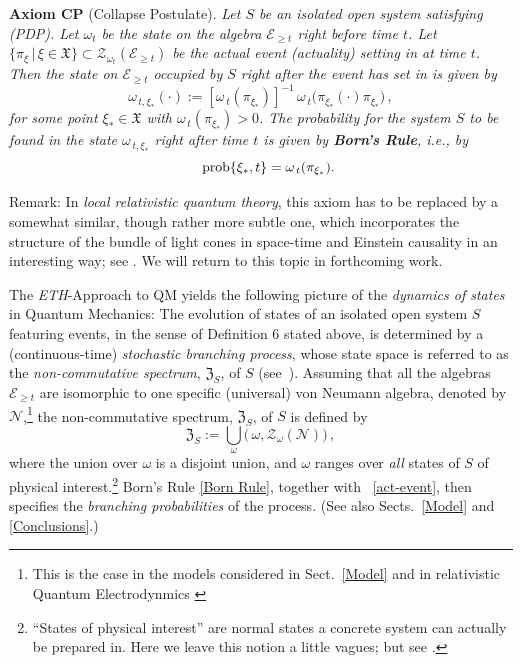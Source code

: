 \documentclass[12pt]{article}
\begin{document}
{\bf{Axiom CP}} (Collapse Postulate).\label{collapseaxiom} \textit{Let $S$ be an isolated open system satisfying (\textit{PDP}). Let
$\omega_t$ be the state on the algebra $\mathcal{E}_{\geq t}$ right \textit{before} time $t$. Let
$\big\{ \pi_{\xi} \,|\, \xi \in \mathfrak{X} \big\} \subset \mathcal{Z}_{\omega_t}(\mathcal{E}_{\geq t})$ be the actual event (actuality) setting in at time $t$. Then the state on $\mathcal{E}_{\geq t}$ occupied by $S$ right \textit{after} the event has set in is given by
$$
\omega_{\,t, \xi_{*}}(\cdot):=[\omega_{\,t}(\pi_{\xi_{*}})]^{-1}\,\omega_{\,t}\big(\pi_{\xi_{*}} (\cdot) \pi_{\xi_{*}}\big) \,,
$$
for some point $\xi_{*} \in \mathfrak{X}$ with $\omega_{\,t}(\pi_{\xi_{*}})>0$. The probability for the system $S$ to be found in the state $\omega_{\,t,\xi_{*}}$ right \textit{after} time $t$ is given by {\bf{Born's Rule}}, i.e., by}
\begin{equation}\label{Born Rule}
\hspace{4.9cm}\text{\rm{prob}}\{\xi_{*}, t\} = \omega_{\,t}(\pi_{\xi_{*}}). \hspace{4.5cm} \square
\vspace{0.2cm}
\end{equation}

{Remark}: In \textit{local relativistic quantum theory}, this axiom has to be replaced by a somewhat similar, though
rather more subtle one, which incorporates the structure of the bundle of light cones in space-time and Einstein causality in an
interesting way; see \cite{Fr2}. We will return to this topic in forthcoming work.

The \textit{ETH}-Approach to QM yields the following picture of the \textit{dynamics of states} in Quantum Mechanics:
The evolution of states of an isolated open system $S$ featuring events, in the sense of Definition 6 stated above,
is determined by a (continuous-time) \textit{stochastic branching process}, whose state space is referred to
as the {\em{non-commutative spectrum}}, $\mathfrak{Z}_{S}$, of $S$ (see~\cite{Fr1}). Assuming that all the algebras
$\mathcal{E}_{\geq t}$ are isomorphic to one specific (universal) von Neumann algebra, denoted by $\mathcal{N}$,\footnote{This is the case in the models considered in Sect.~\ref{Model} and in relativistic Quantum Electrodynmics  \cite{Buchholz}} the non-commutative spectrum, $\mathfrak{Z}_{S}$, of $S$ is defined by
\begin{equation}\label{NCspect}
\mathfrak{Z}_{S}:= \bigcup_{\omega} \Big(\,\omega, \mathcal{Z}_{\omega}(\mathcal{N})\Big)\,,
\end{equation}
where the union over $\omega$ is a disjoint union, and $\omega$ ranges over \textit{all} states of $S$ of physical interest.\footnote{``States of physical interest'' are normal states a concrete system can actually be prepared in. Here we leave this notion a little vagues; but see \cite{Haag, Fr-Schub}.}
Born's Rule \eqref{Born Rule}, together with ~\eqref{act-event}, then specifies the \textit{branching probabilities}
of the process. (See also Sects.~\ref{Model} and \ref{Conclusions}.)\\
\end{document}
